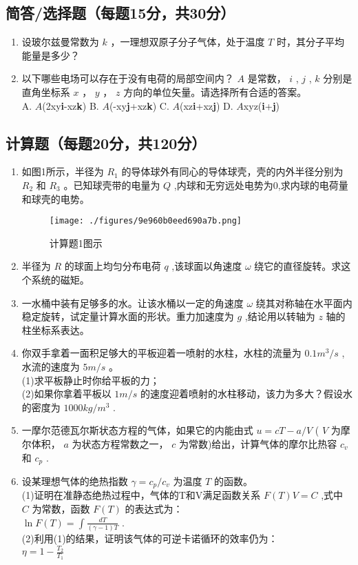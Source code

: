 


\subsection{简答/选择题（每题15分，共30分）}
\begin{enumerate}
\item 设玻尔兹曼常数为 $k$ ，一理想双原子分子气体，处于温度 $T$ 时，其分子平均能量是多少？
\item 以下哪些电场可以存在于没有电荷的局部空间内？ $A$ 是常数， $i$ , $j$ , $k$ 分别是直角坐标系 $x$ ， $y$ ， $z$ 方向的单位矢量。请选择所有合适的答案。\\
A. $A$(2xy\textbf{i}-xz\textbf{k}) B. $A$(-xy\textbf{j}+xz\textbf{k}) C. $A$(xz\textbf{i}+xz\textbf{j}) D. $A$xyz(\textbf{i}+\textbf{j})
\end{enumerate}
\subsection{计算题（每题20分，共120分）}
\begin{enumerate}
\item 如图1所示，半径为 $R_1$ 的导体球外有同心的导体球壳，壳的内外半径分别为 $R_2$ 和 $R_3$ 。已知球壳带的电量为 $Q$ ,内球和无穷远处电势为0,求内球的电荷量和球壳的电势。\\
\begin{figure}[ht]
\centering
\texttt{[image: ./figures/9e960b0eed690a7b.png]}
\caption{计算题1图示} \label{fig_USTC16_1}
\end{figure}
\item 半径为 $R$ 的球面上均匀分布电荷 $q$ ,该球面以角速度 $\omega$ 绕它的直径旋转。求这个系统的磁矩。
\item 一水桶中装有足够多的水。让该水桶以一定的角速度 $\omega$ 绕其对称轴在水平面内稳定旋转，试定量计算水面的形状。重力加速度为 $g$ ,结论用以转轴为 $z$ 轴的柱坐标系表达。
\item 你双手拿着一面积足够大的平板迎着一喷射的水柱，水柱的流量为 $0.1m^{3}/s$ ,水流的速度为 $5m/s$ 。\\
(1)求平板静止时你给平板的力；\\
(2)如果你拿着平板以 $1m/s$ 的速度迎着喷射的水柱移动，该力为多大？假设水的密度为 $1000kg/m^{3}$ .
\item 一摩尔范德瓦尔斯状态方程的气体，如果它的内能由式 $u=cT-a/V$ ( $V$ 为摩尔体积， $a$ 为状态方程常数之一， $c$ 为常数)给出，计算气体的摩尔比热容 $c_v$ 和 $c_p$ .
\item 设某理想气体的绝热指数 $\gamma =c_p/c_v$ 为温度 $T$ 的函数。\\
(1)证明在准静态绝热过程中，气体的T和V满足函数关系 $F(T)V=C$ ,式中 $C$ 为常数，函数 $F(T)$ 的表达式为：\\
 $\ln F(T)=\int \frac{dT}{(\gamma-1)T}$ .\\
(2)利用(1)的结果，证明该气体的可逆卡诺循环的效率仍为：\\
$\eta =1-\frac{T_2}{T_1}$
\end{enumerate}
